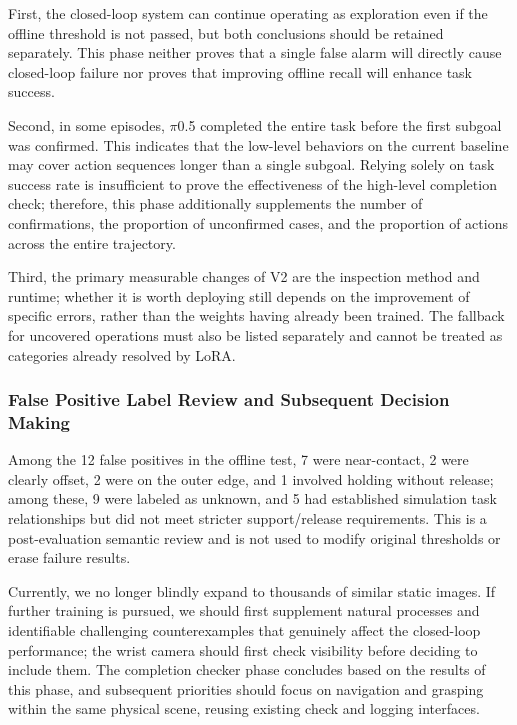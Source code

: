 First, the closed-loop system can continue operating as exploration even if the offline threshold is not passed, but both conclusions should be retained separately. This phase neither proves that a single false alarm will directly cause closed-loop failure nor proves that improving offline recall will enhance task success.

Second, in some episodes, \(\pi\)0.5 completed the entire task before the first subgoal was confirmed. This indicates that the low-level behaviors on the current baseline may cover action sequences longer than a single subgoal. Relying solely on task success rate is insufficient to prove the effectiveness of the high-level completion check; therefore, this phase additionally supplements the number of confirmations, the proportion of unconfirmed cases, and the proportion of actions across the entire trajectory.

Third, the primary measurable changes of V2 are the inspection method and runtime; whether it is worth deploying still depends on the improvement of specific errors, rather than the weights having already been trained. The fallback for uncovered operations must also be listed separately and cannot be treated as categories already resolved by LoRA.

\subsubsection{False Positive Label Review and Subsequent Decision Making}\label{s12-detail-6}

Among the 12 false positives in the offline test, 7 were near-contact, 2 were clearly offset, 2 were on the outer edge, and 1 involved holding without release; among these, 9 were labeled as unknown, and 5 had established simulation task relationships but did not meet stricter support/release requirements. This is a post-evaluation semantic review and is not used to modify original thresholds or erase failure results.

Currently, we no longer blindly expand to thousands of similar static images. If further training is pursued, we should first supplement natural processes and identifiable challenging counterexamples that genuinely affect the closed-loop performance; the wrist camera should first check visibility before deciding to include them. The completion checker phase concludes based on the results of this phase, and subsequent priorities should focus on navigation and grasping within the same physical scene, reusing existing check and logging interfaces.


